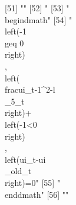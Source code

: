 [51] ""                                                                                                                                                                                                                                                                                                                                            
[52] "%
[53] "\\begin{dmath}"                                                                                                                                                                                                                                                                                                                              
[54] "\\left(-1\\geq 0\\right)\\, \\left(\\frac{{ui_{t}}}{-1^{2}}-{{l\\_5}_{t}}\\right)+\\left(-1<0\\right)\\, \\left({ui_{t}}-{{ui\\_old}_{t}}\\right)=0"                                                                                                                                                                                         
[55] "\\end{dmath}"                                                                                                                                                                                                                                                                                                                                
[56] ""                                                                                                                                                                                                                                                                                                                                            
